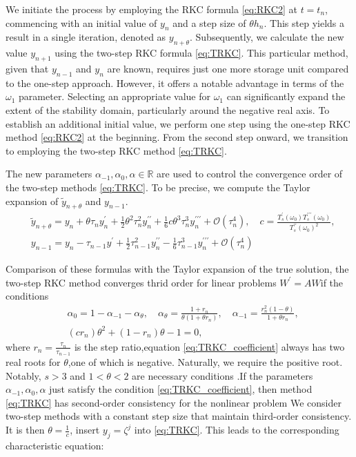 \documentclass[review,fleqn]{elsarticle}
\begin{document}
We initiate the process by employing the RKC formula \eqref{eq:RKC2} at $t = t_{n}$, commencing with an initial value of $y_{n}$ and a step size of $\theta h_{n}$. This step yields a result in a single iteration, denoted as $y_{n+\theta}$.
Subsequently, we calculate the new value $y_{n+1}$ using the two-step RKC formula \eqref{eq:TRKC}. This particular method, given that $y_{n-1}$ and $y_{n}$ are known, requires just one more storage unit compared to the one-step approach. However,
 it offers a notable advantage in terms of the $\omega_{1}$ parameter. Selecting an appropriate value for $\omega_{1}$ can significantly expand the extent of the stability domain, particularly around the negative real axis.
To establish an additional initial value, we perform one step using the one-step RKC method \eqref{eq:RKC2} at the beginning. From the second step onward, we transition to employing the two-step RKC method \eqref{eq:TRKC}.

The new parameters $\alpha_{-1}, \alpha_{0}, \alpha \in \mathbb{R} $ are used to control the convergence order of the two-step methods \eqref{eq:TRKC}. To be precise, we compute the Taylor expansion of $\tilde{y}_{n+\theta}$ and $y_{n-1}$.
\begin{align}
    &\tilde{y}_{n+\theta}=y_n+\theta\tau_ny_n^{\prime}+\frac12\theta^2\tau_n^2y_n^{\prime\prime}+\frac16c\theta^3\tau_n^3y_n^{\prime\prime\prime}+\mathcal{O}(\tau_n^4),\quad c=\frac{T_s^{\prime}(\omega_0)T_s^{\prime\prime\prime}(\omega_0)}{T_s^{\prime\prime}(\omega_0)^2},\\
    &{y}_{n-1}=y_n-\tau_{n-1}y^{\prime}+\frac12\tau_{n-1}^2y_n^{\prime\prime}-\frac16\tau_{n-1}^3y_n^{\prime\prime\prime}+\mathcal{O}(\tau_n^4)
 \end{align}

Comparison of these formulas with the Taylor expansion of the true solution, the two-step RKC method converges thrid order for linear problems $W^{\prime}=AW$if the conditions
\begin{equation}
 \begin{aligned}
 &\alpha_0 = 1 - \alpha_{-1} - \alpha_{\theta}, \quad \alpha_{\theta} = \frac{1 + r_n}{\theta(1 + \theta r_n)}, \quad \alpha_{-1} = \frac{r_n^2(1 - \theta)}{1 + \theta r_n},\\
 &(cr_{n})\theta^{2}+(1-r_{n})\theta-1=0,
 \end{aligned}
 \label{eq:TRKC_coefficient}
\end{equation}
where $r_n=\frac{\tau_n}{\tau_{n-1}}$ is the step ratio,equation \eqref{eq:TRKC_coefficient} always has two real roots for $\theta$,one of which is negative. Naturally, we require the positive root.
Notably, $s>3$ and $1<\theta<2$ are necessary conditions .If the parameters $\alpha_{-1}, \alpha_{0}, \alpha $ just satisfy the condition \eqref{eq:TRKC_coefficient}, then method \eqref{eq:TRKC} has second-order consistency for the nonlinear problem
We consider two-step methods with a constant step size that maintain third-order consistency. It is then $\theta = \frac{1}{c}$, insert $y_j=\zeta^j$ into \eqref{eq:TRKC}. This leads to the corresponding characteristic equation:
\end{document}
